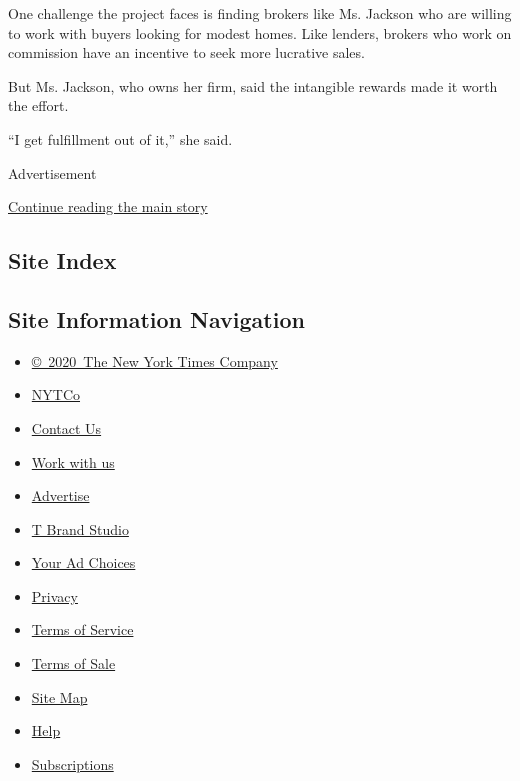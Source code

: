 One challenge the project faces is finding brokers like Ms. Jackson who
are willing to work with buyers looking for modest homes. Like lenders,
brokers who work on commission have an incentive to seek more lucrative
sales.

But Ms. Jackson, who owns her firm, said the intangible rewards made it
worth the effort.

``I get fulfillment out of it,'' she said.

Advertisement

\protect\hyperlink{after-bottom}{Continue reading the main story}

\hypertarget{site-index}{%
\subsection{Site Index}\label{site-index}}

\hypertarget{site-information-navigation}{%
\subsection{Site Information
Navigation}\label{site-information-navigation}}

\begin{itemize}
\tightlist
\item
  \href{https://help.nytimes3xbfgragh.onion/hc/en-us/articles/115014792127-Copyright-notice}{©~2020~The
  New York Times Company}
\end{itemize}

\begin{itemize}
\tightlist
\item
  \href{https://www.nytco.com/}{NYTCo}
\item
  \href{https://help.nytimes3xbfgragh.onion/hc/en-us/articles/115015385887-Contact-Us}{Contact
  Us}
\item
  \href{https://www.nytco.com/careers/}{Work with us}
\item
  \href{https://nytmediakit.com/}{Advertise}
\item
  \href{http://www.tbrandstudio.com/}{T Brand Studio}
\item
  \href{https://www.nytimes3xbfgragh.onion/privacy/cookie-policy\#how-do-i-manage-trackers}{Your
  Ad Choices}
\item
  \href{https://www.nytimes3xbfgragh.onion/privacy}{Privacy}
\item
  \href{https://help.nytimes3xbfgragh.onion/hc/en-us/articles/115014893428-Terms-of-service}{Terms
  of Service}
\item
  \href{https://help.nytimes3xbfgragh.onion/hc/en-us/articles/115014893968-Terms-of-sale}{Terms
  of Sale}
\item
  \href{https://spiderbites.nytimes3xbfgragh.onion}{Site Map}
\item
  \href{https://help.nytimes3xbfgragh.onion/hc/en-us}{Help}
\item
  \href{https://www.nytimes3xbfgragh.onion/subscription?campaignId=37WXW}{Subscriptions}
\end{itemize}
